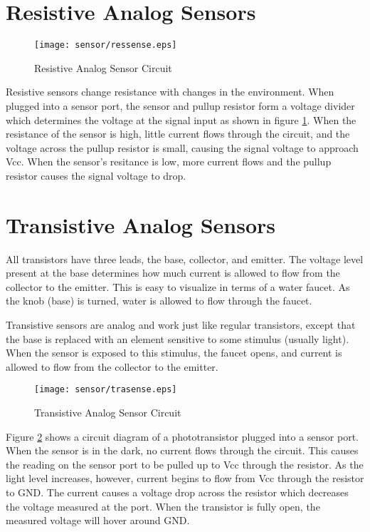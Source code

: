 \section{Resistive Analog Sensors}

\begin{figure}[htbp]
\begin{center}
\texttt{[image: sensor/ressense.eps]}
\caption{Resistive Analog Sensor Circuit}
\label{ressense}
\end{center}
\end{figure}

Resistive sensors change resistance with changes in the
environment. When plugged into a sensor port, the sensor and pullup
resistor form a voltage divider which determines the voltage at the
signal input as shown in figure \ref{ressense}. When the resistance of
the sensor is high, little current flows through the circuit, and the
voltage across the pullup resistor is small, causing the signal
voltage to approach Vcc. When the sensor's resitance is low, more
current flows and the pullup resistor causes the signal voltage to
drop.



\section{Transistive Analog Sensors}

All transistors have three leads, the base, collector, and
emitter. The voltage level present at the base determines how much
current is allowed to flow from the collector to the emitter. This is
easy to visualize in terms of a water faucet. As the knob (base) is
turned, water is allowed to flow through the faucet.

Transistive sensors are analog and work just like regular transistors,
except that the base is replaced with an element sensitive to some
stimulus (usually light). When the sensor is exposed to this stimulus,
the faucet opens, and current is allowed to flow from the collector to
the emitter.

\begin{figure}[htbp]
\begin{center}
\texttt{[image: sensor/trasense.eps]}
\caption{Transistive Analog Sensor Circuit}
\label{trasense}
\end{center}
\end{figure}

Figure \ref{trasense} shows a circuit diagram of a phototransistor
plugged into a sensor port. When the sensor is in the dark, no current
flows through the circuit. This causes the reading on the sensor port
to be pulled up to Vcc through the resistor. As the light level
increases, however, current begins to flow from Vcc through the
resistor to GND. The current causes a voltage drop across the resistor
which decreases the voltage measured at the port. When the transistor
is fully open, the measured voltage will hover around GND.


